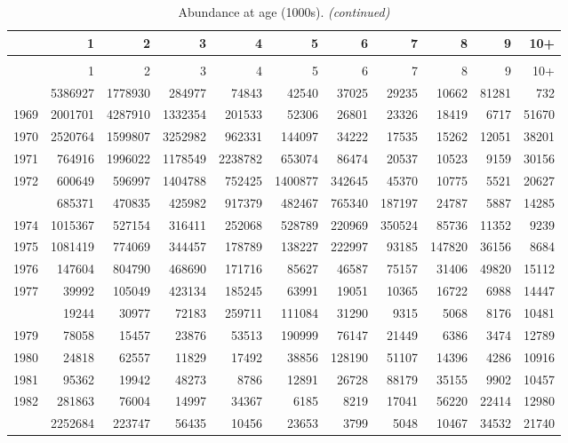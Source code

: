 \documentclass[
]{article}
\begin{document}
\begin{longtable}[t]{lrrrrrrrrrr}
\caption{\label{tab:NAA-table}Abundance at age (1000s).}\\
\toprule
  & 1 & 2 & 3 & 4 & 5 & 6 & 7 & 8 & 9 & 10+\\
\midrule
\endfirsthead
\caption[]{Abundance at age (1000s). \textit{(continued)}}\\
\toprule
  & 1 & 2 & 3 & 4 & 5 & 6 & 7 & 8 & 9 & 10+\\
\midrule
\endhead

\endfoot
\bottomrule
\endlastfoot
1968 & 5386927 & 1778930 & 284977 & 74843 & 42540 & 37025 & 29235 & 10662 & 81281 & 732\\
1969 & 2001701 & 4287910 & 1332354 & 201533 & 52306 & 26801 & 23326 & 18419 & 6717 & 51670\\
1970 & 2520764 & 1599807 & 3252982 & 962331 & 144097 & 34222 & 17535 & 15262 & 12051 & 38201\\
1971 & 764916 & 1996022 & 1178549 & 2238782 & 653074 & 86474 & 20537 & 10523 & 9159 & 30156\\
1972 & 600649 & 596997 & 1404788 & 752425 & 1400877 & 342645 & 45370 & 10775 & 5521 & 20627\\
\addlinespace
1973 & 685371 & 470835 & 425982 & 917379 & 482467 & 765340 & 187197 & 24787 & 5887 & 14285\\
1974 & 1015367 & 527154 & 316411 & 252068 & 528789 & 220969 & 350524 & 85736 & 11352 & 9239\\
1975 & 1081419 & 774069 & 344457 & 178789 & 138227 & 222997 & 93185 & 147820 & 36156 & 8684\\
1976 & 147604 & 804790 & 468690 & 171716 & 85627 & 46587 & 75157 & 31406 & 49820 & 15112\\
1977 & 39992 & 105049 & 423134 & 185245 & 63991 & 19051 & 10365 & 16722 & 6988 & 14447\\
\addlinespace
1978 & 19244 & 30977 & 72183 & 259711 & 111084 & 31290 & 9315 & 5068 & 8176 & 10481\\
1979 & 78058 & 15457 & 23876 & 53513 & 190999 & 76147 & 21449 & 6386 & 3474 & 12789\\
1980 & 24818 & 62557 & 11829 & 17492 & 38856 & 128190 & 51107 & 14396 & 4286 & 10916\\
1981 & 95362 & 19942 & 48273 & 8786 & 12891 & 26728 & 88179 & 35155 & 9902 & 10457\\
1982 & 281863 & 76004 & 14997 & 34367 & 6185 & 8219 & 17041 & 56220 & 22414 & 12980\\
\addlinespace
1983 & 2252684 & 223747 & 56435 & 10456 & 23653 & 3799 & 5048 & 10467 & 34532 & 21740\\

\end{longtable}
\end{document}
